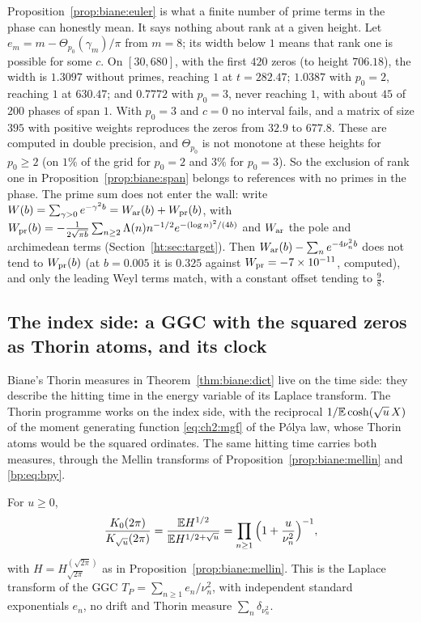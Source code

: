 Proposition~\ref{prop:biane:euler} is what a finite number of prime terms in the phase can honestly mean. It says nothing about rank at a given height. Let $e_m=m-\Theta_{p_0}(\gamma_m)/\pi$ from $m=8$; its width below $1$ means that rank one is possible for some $c$. On $[30,680]$, with the first $420$ zeros (to height $706.18$), the width is $1.3097$ without primes, reaching $1$ at $t=282.47$; $1.0387$ with $p_0=2$, reaching $1$ at $630.47$; and $0.7772$ with $p_0=3$, never reaching $1$, with about $45$ of $200$ phases of span $1$. With $p_0=3$ and $c=0$ no interval fails, and a matrix of size $395$ with positive weights reproduces the zeros from $32.9$ to $677.8$. These are computed in double precision, and $\Theta_{p_0}$ is not monotone at these heights for $p_0\ge2$ (on $1\%$ of the grid for $p_0=2$ and $3\%$ for $p_0=3$). So the exclusion of rank one in Proposition~\ref{prop:biane:span} belongs to references with no primes in the phase. The prime sum does not enter the wall: write $W(b)=\sum_{\gamma>0}e^{-\gamma^2b}=W_{\rm ar}(b)+W_{\rm pr}(b)$, with $W_{\rm pr}(b)=-\frac1{2\sqrt{\pi b}}\sum_{n\ge2}\Lambda(n)n^{-1/2}e^{-(\log n)^2/(4b)}$ and $W_{\rm ar}$ the pole and archimedean terms (Section~\ref{ht:sec:target}). Then $W_{\rm ar}(b)-\sum_ne^{-4\nu_n^2b}$ does not tend to $W_{\rm pr}(b)$ (at $b=0.005$ it is $0.325$ against $W_{\rm pr}=-7\times10^{-11}$, computed), and only the leading Weyl terms match, with a constant offset tending to $\frac98$.

\subsection{The index side: a GGC with the squared zeros as Thorin atoms, and its clock}\label{sec:biane:index}

Biane's Thorin measures in Theorem~\ref{thm:biane:dict} live on the time side: they describe the hitting time in the energy variable of its Laplace transform. The Thorin programme works on the index side, with the reciprocal $1/\mathbb{E}\cosh(\sqrt u\,X)$ of the moment generating function \eqref{eq:ch2:mgf} of the P\'olya law, whose Thorin atoms would be the squared ordinates. The same hitting time carries both measures, through the Mellin transforms of Proposition~\ref{prop:biane:mellin} and \eqref{bp:eq:bpy}.

\begin{theorem}\label{thm:biane:indexP}
For $u\ge0$,
\[
\frac{K_0(2\pi)}{K_{\sqrt u}(2\pi)}=\frac{\mathbb{E} H^{1/2}}{\mathbb{E} H^{1/2+\sqrt u}}=\prod_{n\ge1}\Big(1+\frac u{\nu_n^2}\Big)^{-1},
\]
with $H=H^{(\sqrt{2\pi})}_{\sqrt{2\pi}}$ as in Proposition~\ref{prop:biane:mellin}. This is the Laplace transform of the GGC $T_P=\sum_{n\ge1}e_n/\nu_n^2$, with independent standard exponentials $e_n$, no drift and Thorin measure $\sum_n\delta_{\nu_n^2}$.
\end{theorem}

